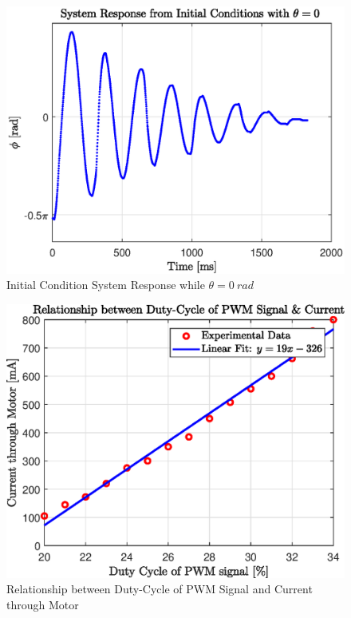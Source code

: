 \documentclass[a4paper,12pt]{article}
\begin{document}
	
	\begin{figure}[h]
		\centering
		\includegraphics[scale=1]{q2_initial_response.eps}
		\caption{Initial Condition System Response while $ \theta = \SI{0}{rad} $ }
		\label{fig:q2_response}
	\end{figure}

	\begin{figure}[h]
	\centering
	\includegraphics[scale=1]{dutycycle_vs_current.eps}
	\caption{Relationship between Duty-Cycle of PWM Signal and Current through Motor}
	\label{fig:dutycycle_vs_current}
\end{figure}
\end{document}
